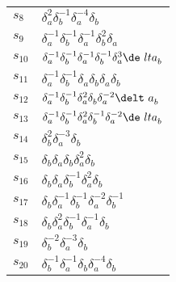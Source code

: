 \documentclass{article}
\begin{document}
\begin{center}
\begin{tabular}{ll}
$s_{8}$ & $\delta_a^{2}\delta_b^{-1}\delta_a^{-4}\delta_b^{}$ \\
$s_{9}$ & $\delta_a^{-1}\delta_b^{-1}\delta_a^{-1}\delta_b^{2}\delta_a^{}$ \\
$s_{10}$ & $\delta_a^{-1}\delta_b^{-1}\delta_a^{-1}\delta_b^{-1}\delta_a^{3}\de\
lta_b^{}$ \\
$s_{11}$ & $\delta_a^{-1}\delta_b^{-1}\delta_a^{}\delta_b^{}\delta_a^{}\delta_b\
^{}$ \\
$s_{12}$ & $\delta_a^{-1}\delta_b^{-1}\delta_a^{2}\delta_b^{}\delta_a^{-2}\delt\
a_b^{}$ \\
$s_{13}$ & $\delta_a^{-1}\delta_b^{-1}\delta_a^{2}\delta_b^{-1}\delta_a^{-2}\de\
lta_b^{}$ \\
$s_{14}$ & $\delta_b^{2}\delta_a^{-3}\delta_b^{}$ \\
$s_{15}$ & $\delta_b^{}\delta_a^{}\delta_b^{}\delta_a^{2}\delta_b^{}$ \\
$s_{16}$ & $\delta_b^{}\delta_a^{}\delta_b^{-1}\delta_a^{2}\delta_b^{}$ \\
$s_{17}$ & $\delta_b^{}\delta_a^{-1}\delta_b^{-1}\delta_a^{-2}\delta_b^{-1}$ \\
$s_{18}$ & $\delta_b^{}\delta_a^{2}\delta_b^{-1}\delta_a^{-1}\delta_b^{}$ \\
$s_{19}$ & $\delta_b^{-2}\delta_a^{-3}\delta_b^{}$ \\
$s_{20}$ & $\delta_b^{-1}\delta_a^{-1}\delta_b^{}\delta_a^{-4}\delta_b^{}$ \\
\bottomrule
\end{tabular}
\end{center}

\thispagestyle{empty}
\end{document}
